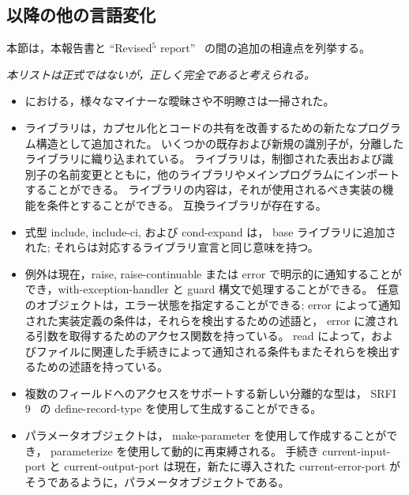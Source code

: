 \subsection*{\rfivers 以降の他の言語変化}
\label{differences}
本節は，本報告書と ``Revised$^5$ report''~\cite{R5RS} の間の追加の相違点を列挙する。

{\em 本リストは正式ではないが，正しく完全であると考えられる。}

\begin{itemize}

\item \rfivers における，様々なマイナーな曖昧さや不明瞭さは一掃された。

\item ライブラリは，カプセル化とコードの共有を改善するための新たなプログラム構造として追加された。
いくつかの既存および新規の識別子が，分離したライブラリに織り込まれている。
ライブラリは，制御された表出および識別子の名前変更とともに，他のライブラリやメインプログラムにインポートすることができる。
ライブラリの内容は，それが使用されるべき実装の機能を条件とすることができる。
\rfivers 互換ライブラリが存在する。

\item 式型 {\cf include}, {\cf include-ci}, および {\cf cond-expand} は， base ライブラリに追加された;
それらは対応するライブラリ宣言と同じ意味を持つ。

\item 例外は現在，{\cf raise}, {\cf raise-continuable} または {\cf error} で明示的に通知することができ，{\cf with-exception-handler} と {\cf guard} 構文で処理することができる。
任意のオブジェクトは，エラー状態を指定することができる;
{\cf error} によって通知された実装定義の条件は，それらを検出するための述語と， {\cf error} に渡される引数を取得するためのアクセス関数を持っている。
{\cf read} によって，およびファイルに関連した手続きによって通知される条件もまたそれらを検出するための述語を持っている。

\item 複数のフィールドへのアクセスをサポートする新しい分離的な型は， SRFI 9~\cite{srfi9} の {\cf define-record-type} を使用して生成することができる。

\item パラメータオブジェクトは， {\cf make-parameter} を使用して作成することができ， {\cf parameterize} を使用して動的に再束縛される。
手続き {\cf current-input-port} と {\cf current-output-port} は現在，新たに導入された {\cf current-error-port} がそうであるように，パラメータオブジェクトである。


\end{itemize}
